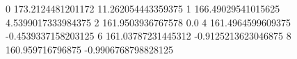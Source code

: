 0 173.2124481201172 11.262054443359375
1 166.49029541015625 4.5399017333984375
2 161.9503936767578 0.0
4 161.4964599609375 -0.4539337158203125
6 161.03787231445312 -0.9125213623046875
8 160.959716796875 -0.9906768798828125
